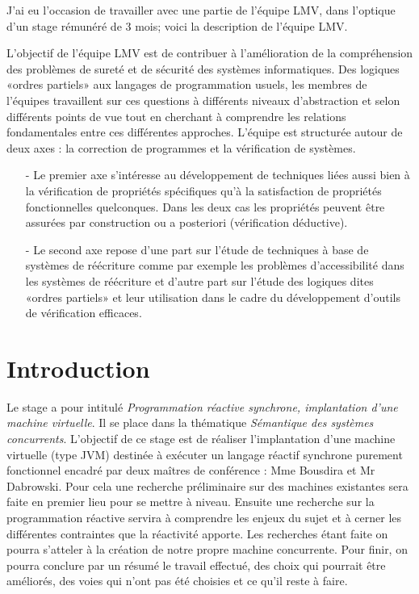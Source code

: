 \documentclass[10pt,a4paper]{article}
\begin{document}
		J'ai eu l'occasion de travailler avec une partie de l'équipe LMV, dans l'optique d'un stage rémunéré de 3 mois; voici la description de l'équipe LMV.
		\medbreak
		
		L'objectif de l'équipe LMV est de contribuer à l'amélioration de la compréhension des problèmes de sureté et de sécurité des systèmes  informatiques. Des logiques «ordres partiels» aux langages de programmation usuels, les membres de l'équipes travaillent sur ces questions à différents niveaux d'abstraction et selon différents points de vue tout en cherchant à comprendre les relations fondamentales entre ces différentes approches. L'équipe est structurée autour de deux axes : la correction de programmes et la vérification de systèmes.
		\begin{enumerate}
			\item[-] Le premier axe s'intéresse au développement de techniques liées aussi bien à la vérification de propriétés spécifiques qu'à la satisfaction de propriétés fonctionnelles quelconques. Dans les deux cas les propriétés peuvent être assurées par construction ou a posteriori (vérification déductive).
			\item[-] Le second axe repose d'une part sur l'étude de techniques à base de systèmes de réécriture comme par exemple les problèmes d'accessibilité dans les systèmes de réécriture et d'autre part sur l'étude des logiques dites «ordres partiels» et leur utilisation dans le cadre du développement d'outils de vérification efficaces.
		\end{enumerate}
		\newpage
		
		
		
	\section{Introduction}

		
		
		Le stage a pour intitulé \textit{Programmation réactive synchrone, implantation d’une machine virtuelle}. Il se place dans la thématique \textit{Sémantique des systèmes concurrents}. L’objectif de ce stage est de réaliser l’implantation d’une machine virtuelle (type JVM) destinée à exécuter un langage réactif synchrone purement fonctionnel encadré par deux maîtres de conférence : Mme Bousdira et Mr Dabrowski.
		\smallbreak
		Pour cela une recherche préliminaire sur des machines existantes sera faite en premier lieu pour se mettre à niveau. Ensuite une recherche sur la programmation réactive servira à comprendre les enjeux du sujet et à cerner les différentes contraintes que la réactivité apporte. Les recherches étant faite on pourra s'atteler à la création de notre propre machine concurrente. Pour finir, on pourra conclure par un résumé le travail effectué, des choix qui pourrait être améliorés, des voies qui n'ont pas été choisies et ce qu'il reste à faire.
		\newpage
		
\end{document}
